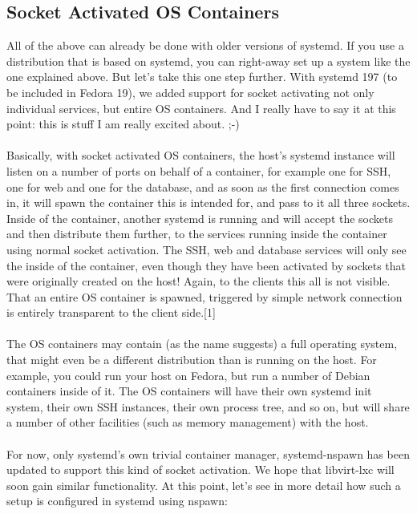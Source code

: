 \documentclass[titlepage]{article}
\begin{document}
\subsection{Socket Activated OS Containers}
All of the above can already be done with older versions of systemd. If you use a distribution that is based on systemd, you can right-away set up a system like the one explained above. But let's take this one step further. With systemd 197 (to be included in Fedora 19), we added support for socket activating not only individual services, but entire OS containers. And I really have to say it at this point: this is stuff I am really excited about. ;-)
\\
\\
Basically, with socket activated OS containers, the host's systemd instance will listen on a number of ports on behalf of a container, for example one for SSH, one for web and one for the database, and as soon as the first connection comes in, it will spawn the container this is intended for, and pass to it all three sockets. Inside of the container, another systemd is running and will accept the sockets and then distribute them further, to the services running inside the container using normal socket activation. The SSH, web and database services will only see the inside of the container, even though they have been activated by sockets that were originally created on the host! Again, to the clients this all is not visible. That an entire OS container is spawned, triggered by simple network connection is entirely transparent to the client side.[1]
\\
\\
The OS containers may contain (as the name suggests) a full operating system, that might even be a different distribution than is running on the host. For example, you could run your host on Fedora, but run a number of Debian containers inside of it. The OS containers will have their own systemd init system, their own SSH instances, their own process tree, and so on, but will share a number of other facilities (such as memory management) with the host.
\\
\\
For now, only systemd's own trivial container manager, systemd-nspawn has been updated to support this kind of socket activation. We hope that libvirt-lxc will soon gain similar functionality. At this point, let's see in more detail how such a setup is configured in systemd using nspawn:
\\
\\
\end{document}
